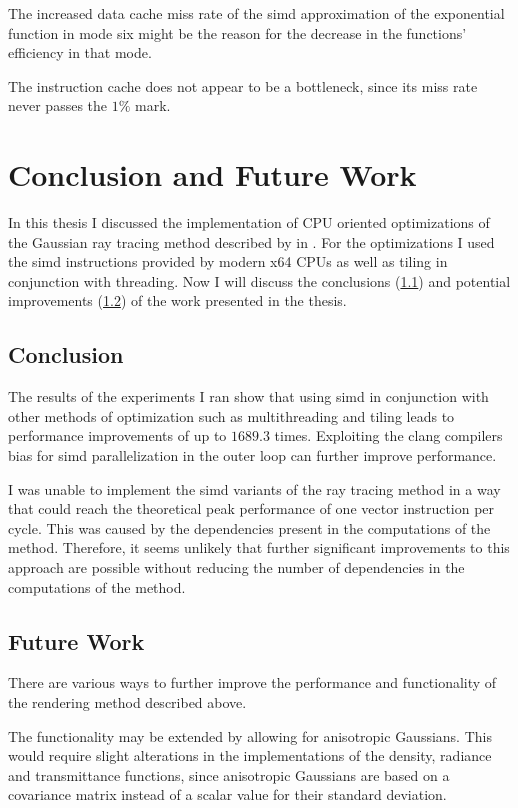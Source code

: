 \documentclass[a4paper, 11pt]{memoir}
\begin{document}
    The increased data cache miss rate of the \gls{simd} approximation of the exponential function in mode six might be
    the reason for the decrease in the functions' efficiency in that mode.

    The instruction cache does not appear to be a bottleneck, since its miss rate never passes the $1\%$ mark.

    \chapter{Conclusion and Future Work}
    \label{ch:conclusions}
    In this thesis I discussed the implementation of CPU oriented optimizations of the Gaussian ray tracing method described
    by \citeauthor{Rhodin:2015} in \cite{Rhodin:2015}. For the optimizations I used the \gls{simd} instructions provided
    by modern x64 CPUs as well as tiling in conjunction with threading. Now I will discuss the conclusions (\ref{sec:conclusions})
    and potential improvements (\ref{sec:future_work}) of the work presented in the thesis.

    \section{Conclusion}
    \label{sec:conclusions}
    The results of the experiments I ran show that using \gls{simd} in conjunction with other methods of optimization such
    as multithreading and tiling leads to performance improvements of up to $1689.3$ times. Exploiting the clang compilers
    bias for \gls{simd} parallelization in the outer loop can further improve performance.

    I was unable to implement the \gls{simd} variants of the ray tracing method in a way that could reach the
    theoretical peak performance of one vector instruction per cycle. This was caused by the dependencies present in the
    computations of the method. Therefore, it seems unlikely that further significant improvements to this approach are
    possible without reducing the number of dependencies in the computations of the method.

    \section{Future Work}
    \label{sec:future_work}
    There are various ways to further improve the performance and functionality of the rendering method described above.

    The functionality may be extended by allowing for anisotropic Gaussians. This would require slight alterations in the
    implementations of the density, \gls{radiance} and \gls{transmittance} functions, since anisotropic Gaussians are
    based on a covariance matrix instead of a scalar value for their standard deviation.
\end{document}
